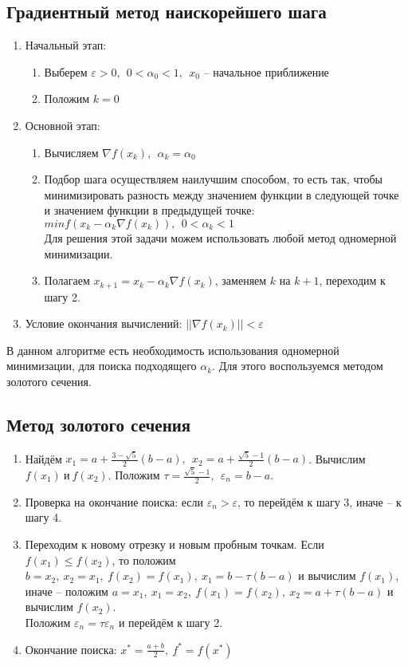 \documentclass{article}
\newcommand{\RomanNumeralCaps}[1]
    {\MakeUppercase{\romannumeral #1}}
\begin{document}
\subsection{Градиентный метод наискорейшего шага}
\begin{enumerate}
    \item Начальный этап:
        \begin{enumerate}
             \item Выберем $\varepsilon>0,~~0<\alpha_0<1,~~x_0$ -- начальное приближение
             \item Положим $k=0$
        \end{enumerate}
    \item Основной этап:
        \begin{enumerate}
            \item Вычисляем $\nabla f(x_k),~~\alpha_k=\alpha_0$
            \item Подбор шага осуществляем наилучшим способом, то есть так, чтобы минимизировать разность между значением функции в следующей точке и значением функции в предыдущей точке:  $min f(x_k-\alpha_k \nabla f(x_k)),~~0<\alpha_k<1$\\
            Для решения этой задачи можем использовать любой метод одномерной минимизации.
            \item Полагаем $x_{k+1}=x_k-\alpha_k \nabla f(x_k)$, заменяем $k$ на $k+1$, переходим к шагу 2.\RomanNumeralCaps{1}
        \end{enumerate}
    \item Условие окончания вычислений:  $||\nabla f(x_k)||<\varepsilon$
\end{enumerate} 

\noindent В данном алгоритме есть необходимость использования одномерной минимизации, для поиска подходящего $\alpha_k$. Для этого воспользуемся методом золотого сечения.

\subsection{Метод золотого сечения}
\begin{enumerate}
    \item Найдём $x_1=a+\frac{3-\sqrt{5}}{2}(b-a),~~x_2=a+\frac{\sqrt{5}-1}{2}(b-a)$. Вычислим $f(x_1)~и~f(x_2)$. Положим $\tau=\frac{\sqrt{5}-1}{2},~~\varepsilon_n=b-a$.
    \item Проверка на окончание поиска: если $\varepsilon_n>\varepsilon$, то перейдём к шагу 3, иначе -- к шагу 4.
    \item Переходим к новому отрезку и новым пробным точкам. Если $f(x_1)\le f(x_2)$, то положим $b=x_2,~x_2=x_1,~f(x_2)=f(x_1),~x_1=b-\tau (b-a)$ и вычислим $f(x_1)$, иначе -- положим $a=x_1,~x_1=x_2,~f(x_1)=f(x_2),~ x_2=a+\tau (b-a)$ и вычислим $f(x_2)$. \\
    Положим $\varepsilon_n=\tau \varepsilon_n$ и перейдём к шагу 2.
    \item Окончание поиска: $x^{*}=\frac{a+b}{2},~f^{*}=f(x^{*})$
\end{enumerate}
\end{document}
